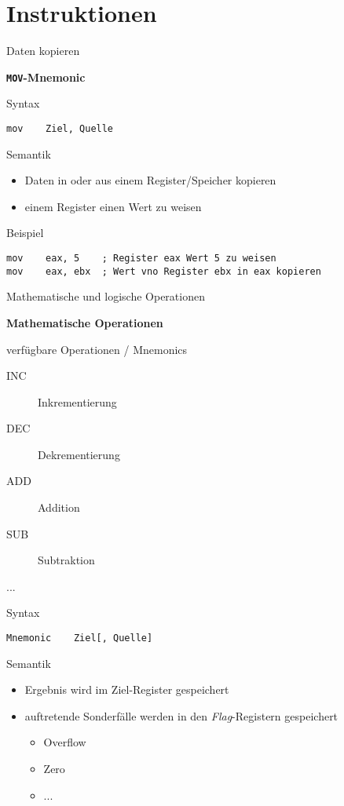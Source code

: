\section{Instruktionen}

\begin{frame}[fragile]{Daten kopieren}

\begin{center}
\textbf{\texttt{MOV}-Mnemonic}
\end{center}

Syntax
\begin{lstlisting}
mov    Ziel, Quelle
\end{lstlisting}

\makebox{}

Semantik
\begin{itemize}
	\item Daten in oder aus einem Register/Speicher kopieren
	\item einem Register einen Wert zu weisen
\end{itemize}

\makebox{}

Beispiel
\begin{lstlisting}
mov    eax, 5    ; Register eax Wert 5 zu weisen
mov    eax, ebx  ; Wert vno Register ebx in eax kopieren
\end{lstlisting}

\end{frame}

\begin{frame}[fragile]{Mathematische und logische Operationen}

\begin{center}
\textbf{Mathematische Operationen}
\end{center}

verfügbare Operationen / Mnemonics
\begin{description}
	\item [INC] Inkrementierung
	\item [DEC] Dekrementierung
	\item [ADD] Addition
	\item [SUB] Subtraktion
	\item [...]
\end{description}

\makebox{}

Syntax
\begin{lstlisting}
Mnemonic    Ziel[, Quelle]
\end{lstlisting}

\makebox{}

Semantik
\begin{itemize}
	\item Ergebnis wird im Ziel-Register gespeichert

	\item auftretende Sonderfälle werden in den \textit{Flag}-Registern gespeichert
	\begin{itemize}
		\item Overflow
		\item Zero
		\item ...
	\end{itemize}
\end{itemize}
\end{frame}

